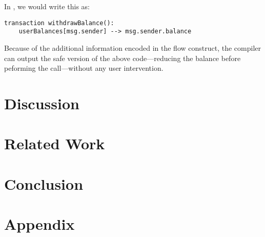\documentclass[sigconf]{acmart}
\begin{document}
In \langName, we would write this as:

\begin{lstlisting}
transaction withdrawBalance():
    userBalances[msg.sender] --> msg.sender.balance
\end{lstlisting}

Because of the additional information encoded in the flow construct, the compiler can output the safe version of the above code---reducing the balance before peforming the call---without any user intervention.

\section{Discussion}

\section{Related Work}

\section{Conclusion}




\appendix

\section{Appendix}
\end{document}
